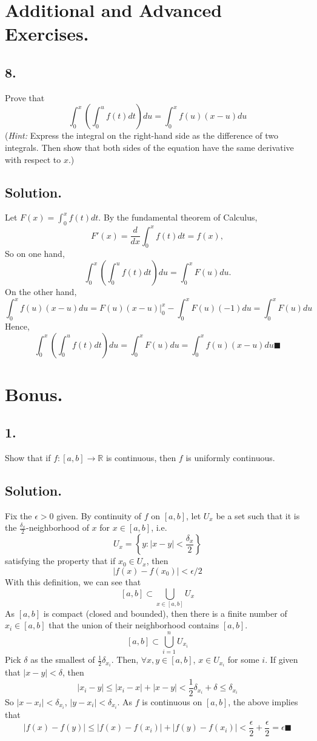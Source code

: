 \documentclass{article}
\begin{document}
\section*{Additional and Advanced Exercises.}
\subsection*{8.}
Prove that 
\[\int_0^x\left(\int_0^uf(t)dt\right)du=\int_0^xf(u)(x-u)du\]
(\textit{Hint:} Express the integral on the right-hand side as the difference of two integrals. Then show that both sides of the equation have the same derivative with respect to $x$.)
\subsection*{Solution.}
Let $F(x)=\int_0^x f(t)dt$.\newline
By the fundamental theorem of Calculus,
\[F'(x)=\frac{d}{dx}\int_0^xf(t)dt=f(x),\]
So on one hand,
\[\int_0^x\left(\int_0^uf(t)dt\right)du=\int_0^x F(u)du.\]
On the other hand,
\[\int_0^xf(u)(x-u)du=F(u)(x-u)|_0^x-\int_0^x F(u)(-1)du=\int_0^x F(u)du\]
Hence,
\[\int_0^x\left(\int_0^uf(t)dt\right)du=\int_0^x F(u)du=\int_0^xf(u)(x-u)du\blacksquare\]
\section*{Bonus.}
\subsection*{1.}
Show that if $f:[a,b]\to\mathbb{R}$ is continuous, then $f$ is uniformly continuous.
\subsection*{Solution.}
Fix the $\epsilon>0$ given.\newline
By continuity of $f$ on $[a,b]$, let $U_x$ be a set such that it is the $\frac{\delta_x}{2}$-neighborhood of $x$ for $x\in[a,b]$, i.e.
\[U_x=\left\{y:|x-y|<\frac{\delta_x}{2}\right\}\]
satisfying the property that if $x_0\in U_x$, then 
\[|f(x)-f(x_0)|<\epsilon/2\]
With this definition, we can see that
\[[a,b]\subset \bigcup_{x\in[a,b]}U_x\]
As $[a,b]$ is compact (closed and bounded), then there is a finite number of $x_i\in[a,b]$ that the union of their neighborhood contains $[a,b]$.
\[[a,b]\subset \bigcup_{i=1}^n U_{x_i}\]
Pick $\delta$ as the smallest of $\frac{1}{2}\delta_{x_i}$.\newline
Then, $\forall x,y\in[a,b]$, $x\in U_{x_i}$ for some $i$.  If given that $|x-y|<\delta$, then
\[|x_i-y|\leq |x_i-x|+|x-y|<\frac{1}{2}\delta_{x_i}+\delta\leq \delta_{x_i}\]
So $|x-x_i|<\delta_{x_i}$, $|y-x_i|<\delta_{x_i}$.
As $f$ is continuous on $[a,b]$, the above implies that 
\[|f(x)-f(y)|\leq |f(x)-f(x_i)|+|f(y)-f(x_i)|<\frac{\epsilon}{2}+\frac{\epsilon}{2}=\epsilon\blacksquare \]
\end{document}
